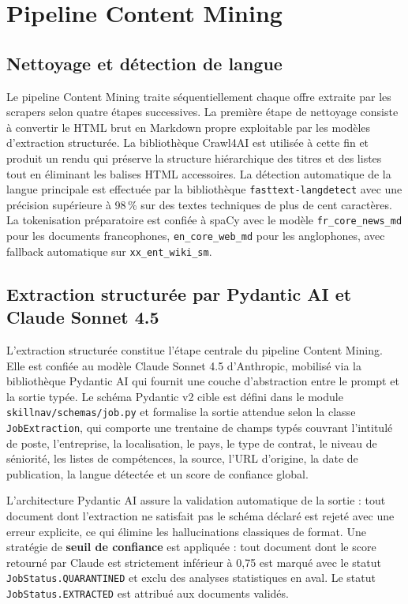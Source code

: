 \documentclass[11pt,a4paper,openany]{report}
\begin{document}
\section{Pipeline Content Mining}

\subsection{Nettoyage et d\'etection de langue}

Le pipeline Content Mining traite s\'equentiellement chaque offre extraite par les scrapers selon quatre \'etapes successives. La premi\`ere \'etape de nettoyage consiste \`a convertir le HTML brut en Markdown propre exploitable par les mod\`eles d'extraction structur\'ee. La biblioth\`eque Crawl4AI est utilis\'ee \`a cette fin et produit un rendu qui pr\'eserve la structure hi\'erarchique des titres et des listes tout en \'eliminant les balises HTML accessoires. La d\'etection automatique de la langue principale est effectu\'ee par la biblioth\`eque \texttt{fasttext-langdetect} avec une pr\'ecision sup\'erieure \`a 98\,\% sur des textes techniques de plus de cent caract\`eres. La tokenisation pr\'eparatoire est confi\'ee \`a spaCy avec le mod\`ele \texttt{fr\_core\_news\_md} pour les documents francophones, \texttt{en\_core\_web\_md} pour les anglophones, avec fallback automatique sur \texttt{xx\_ent\_wiki\_sm}.

\subsection{Extraction structur\'ee par Pydantic AI et Claude Sonnet 4.5}

L'extraction structur\'ee constitue l'\'etape centrale du pipeline Content Mining. Elle est confi\'ee au mod\`ele Claude Sonnet 4.5 d'Anthropic, mobilis\'e via la biblioth\`eque Pydantic AI qui fournit une couche d'abstraction entre le prompt et la sortie typ\'ee. Le sch\'ema Pydantic v2 cible est d\'efini dans le module \texttt{skillnav/schemas/job.py} et formalise la sortie attendue selon la classe \texttt{JobExtraction}, qui comporte une trentaine de champs typ\'es couvrant l'intitul\'e de poste, l'entreprise, la localisation, le pays, le type de contrat, le niveau de s\'eniorit\'e, les listes de comp\'etences, la source, l'URL d'origine, la date de publication, la langue d\'etect\'ee et un score de confiance global.

L'architecture Pydantic AI assure la validation automatique de la sortie : tout document dont l'extraction ne satisfait pas le sch\'ema d\'eclar\'e est rejet\'e avec une erreur explicite, ce qui \'elimine les hallucinations classiques de format. Une strat\'egie de \textbf{seuil de confiance} est appliqu\'ee : tout document dont le score retourn\'e par Claude est strictement inf\'erieur \`a 0,75 est marqu\'e avec le statut \texttt{JobStatus.QUARANTINED} et exclu des analyses statistiques en aval. Le statut \texttt{JobStatus.EXTRACTED} est attribu\'e aux documents valid\'es.
\end{document}
